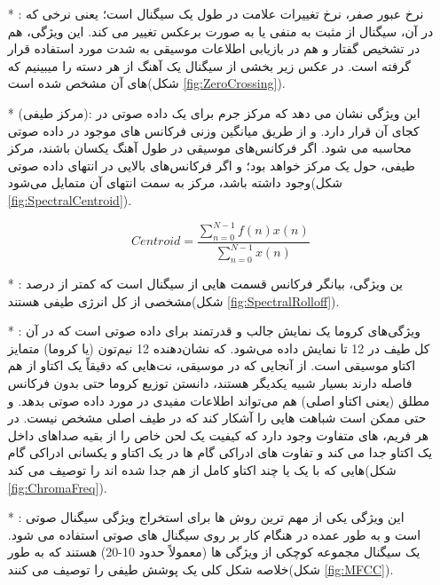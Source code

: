 \documentclass[12pt,onecolumn,a4paper]{article}
\begin{document}
\begin{itemize}
    \item[*] : نرخ عبور صفر، نرخ تغییرات علامت در طول یک سیگنال است؛ یعنی نرخی که در آن، سیگنال از مثبت به منفی یا به صورت برعکس تغییر می کند. این ویژگی، هم در تشخیص گفتار و هم در بازیابی اطلاعات موسیقی به شدت مورد استفاده قرار گرفته است. در عکس زیر بخشی از سیگنال یک آهنگ از هر دسته را میبینیم که  های آن مشخص شده است(شکل \ref{fig:ZeroCrossing}).
    
    \item[*]  (مرکز طیفی): این ویژگی نشان می دهد که مرکز جرم برای یک داده صوتی در کجای آن قرار دارد. و از طریق میانگین وزنی فرکانس های موجود در داده صوتی محاسبه می شود. اگر فرکانس‌های موسیقی در طول آهنگ یکسان باشند، مرکز طیفی، حول یک مرکز خواهد بود؛ و اگر فرکانس‌های بالایی در انتهای داده صوتی وجود داشته باشد، مرکز به سمت انتهای آن متمایل می‌شود(شکل \ref{fig:SpectralCentroid}). 
    
    \begin{equation}
        Centroid = \frac{\sum_{n=0}^{N-1}f(n)x(n)}{\sum_{n=0}^{N-1}x(n)}
    \end{equation}
    
    \item[*] : ین ویژگی، بیانگر فرکانس قسمت هایی از سیگنال است که کمتر از درصد مشخصی از کل انرژی طیفی هستند(شکل \ref{fig:SpectralRolloff}).
    
    \item[*] : ویژگی‌های کروما یک نمایش جالب و قدرتمند برای داده صوتی است که در آن کل طیف در 12 تا  نمایش داده می‌شود. که نشان‌دهنده 12 نیم‌تون (یا کروما) متمایز اکتاو موسیقی است.
از آنجایی که در موسیقی، نت‌هایی که دقیقاً یک اکتاو از هم فاصله دارند بسیار شبیه یکدیگر هستند، دانستن توزیع کروما حتی بدون فرکانس مطلق (یعنی اکتاو اصلی) هم می‌تواند اطلاعات مفیدی در مورد داده صوتی بدهد. و حتی ممکن است شباهت هایی را آشکار کند که در طیف اصلی مشخص نیست.
در هر فریم،  های متفاوت وجود دارد که کیفیت یک لحن خاص را از بقیه صداهای داخل یک اکتاو جدا می کند و تفاوت های ادراکی گام ها در یک اکتاو و یکسانی ادراکی گام هایی که با یک یا چند اکتاو کامل از هم جدا شده اند را توصیف می کند(شکل \ref{fig:ChromaFreq}).

    \item[*] : این ویژگی یکی از مهم ترین روش ها برای استخراج ویژگی سیگنال صوتی است و به طور عمده در هنگام کار بر روی سیگنال های صوتی استفاده می شود.  یک سیگنال مجموعه کوچکی از ویژگی ها (معمولاً حدود 10-20) هستند که به طور خلاصه شکل کلی یک پوشش طیفی را توصیف می کنند(شکل \ref{fig:MFCC}).
    
\end{itemize}
\end{document}

